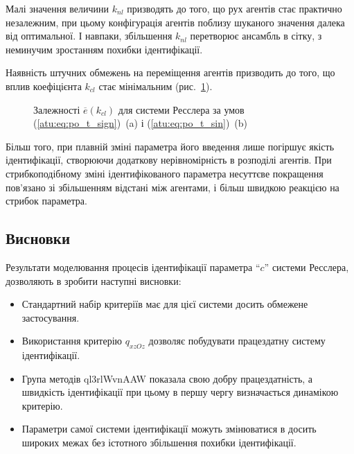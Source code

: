 Малі значення величини
$k_{nl}$ призводять до того, що рух агентів стає практично
незалежним, при цьому конфігурація агентів поблизу шуканого
значення далека від оптимальної. І навпаки, збільшення
$k_{nl}$ перетворює ансамбль в сітку, з неминучим зростанням
похибки ідентифікації.

Наявність штучних обмежень на переміщення агентів призводить
до того, що вплив коефіцієнта
$k_{cl} $ стає мінімальним (рис.~\ref{atu:f:ross_e_k_cl}).

\begin{figure}[htb!]
\caption{Залежності $\overline{e}(k_{cl}) $ для системи Ресслера за умов (\ref{atu:eq:po_t_sign})~(a) і (\ref{atu:eq:po_t_sin})~(b)}
\label{atu:f:ross_e_k_cl}
\end{figure}

Більш того, при плавній зміні параметра його введення
лише погіршує якість ідентифікації, створюючи додаткову
нерівномірність в розподілі агентів. При стрибкоподібному зміні
ідентифікованого параметра несуттєве покращення пов'язано зі
збільшенням відстані між агентами, і більш швидкою реакцією
на стрибок параметра.






\subsection{Висновки} %

Результати моделювання процесів ідентифікації параметра ``$c$''
системи Ресслера, дозволяють в зробити наступні висновки:

\begin{itemize}

  \item
    Стандартний набір критеріїв має для цієї системи досить
    обмежене застосування.

  \item
    Використання критерію
    $ q_{xzOz} $ дозволяє побудувати працездатну систему ідентифікації.

  \item
    Група методів ql3rlWvnAAW показала свою добру працездатність, а
    швидкість ідентифікації при цьому в першу чергу визначається
    динамікою критерію.

  \item
    Параметри самої системи ідентифікації можуть змінюватися
    в досить широких межах без істотного збільшення похибки
    ідентифікації.

\end{itemize}





